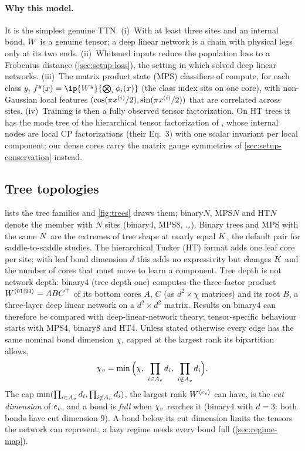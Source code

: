 \paragraph{Why this model.}
It is the simplest genuine TTN. (i)~With at least three sites and an internal bond, $\W$ is a
genuine tensor; a deep linear network is a chain with physical legs only at its two ends.
(ii)~Whitened inputs reduce the population loss to a Frobenius distance (\cref{sec:setup-loss}), the
setting in which \citet{saxe2014exact} solved deep linear networks. (iii)~The matrix product state
(MPS) classifiers of \citet{stoudenmire2016supervised} compute, for each class $y$,
$f^y(x)=\ip{\W^y}{\bigotimes_i\feat{i}(x)}$ (the class index sits on one core), with non-Gaussian
local features $(\cos(\pi\xs{i}/2),\sin(\pi\xs{i}/2))$ that are correlated across sites.
(iv)~Training is then a fully observed tensor factorization. On HT trees it has the mode tree of the
hierarchical tensor factorization of \citet{razin2022implicit}, whose internal nodes are local CP
factorizations (their Eq.~3) with one scalar invariant per local component; our dense cores carry the
matrix gauge symmetries of \cref{sec:setup-conservation} instead.

\subsection{Tree topologies}\label{sec:setup-trees}

 lists the tree families and \cref{fig:trees} draws them; binary$N$, MPS$N$ and
HT$N$ denote the member with $N$ sites (binary4, MPS8, \dots). Binary trees and MPS with the same
$\Ns$ are the extremes of tree shape at nearly equal $\Kc$, the default pair for saddle-to-saddle
studies. The hierarchical Tucker (HT) format adds one leaf core per site; with leaf bond dimension
$d$ this adds no expressivity but changes $\Kc$ and the number of cores that must move to learn a
component. Tree depth is not network depth: binary4 (tree depth one) computes the three-factor
product $\mat{\W}{01|23}=ABC\T$ of its bottom cores $A$, $C$ (as $d^2\times\chi$ matrices) and its
root $B$, a three-layer deep linear network on a $d^2\times d^2$ matrix. Results on binary4 can
therefore be compared with deep-linear-network theory; tensor-specific behaviour starts with MPS4,
binary8 and HT4. Unless stated otherwise every edge has the same nominal bond dimension $\chi$,
capped at the largest rank its bipartition allows,
\begin{equation}\label{eq:bond-cap}
  \bd{v}=\min\Big(\chi,\ \prod_{i\in\below{v}}\pd[i],\ \prod_{i\notin\below{v}}\pd[i]\Big).
\end{equation}
The cap $\min(\prod_{i\in\below{v}}\pd[i],\prod_{i\notin\below{v}}\pd[i])$, the largest rank
$\mat{\W}{\edge{v}}$ can have, is the \emph{cut dimension} of $\edge{v}$, and a bond is \emph{full} when
$\bd{v}$ reaches it (binary4 with $d=3$: both bonds have cut dimension $9$). A bond below its cut
dimension limits the tensors the network can represent; a lazy regime needs every bond full
(\cref{sec:regime-map}).

